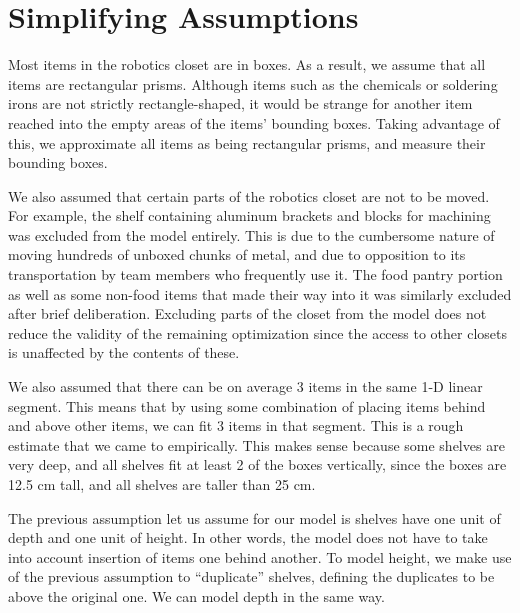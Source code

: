 \documentclass[10pt]{article}
\theoremstyle{named}
\begin{document}
\section{Simplifying Assumptions}
Most items in the robotics closet are in boxes. As a result, we assume that all
items are rectangular prisms. Although items such as the chemicals or soldering irons
are not strictly rectangle-shaped, it would be strange for another item reached into
the empty areas of the items' bounding boxes. Taking advantage of this, we approximate
all items as being rectangular prisms, and measure their bounding boxes.
\par
We also assumed that certain parts of the robotics closet are not to be moved. For
example, the shelf containing aluminum brackets and blocks for machining was excluded
from the model entirely. This is due to the cumbersome nature of moving hundreds of
unboxed chunks of metal, and due to opposition to its transportation by team members
who frequently use it. The food pantry portion as well as some non-food items that
made their way into it was similarly excluded after brief deliberation. Excluding
parts of the closet from the model does not reduce the validity of the remaining
optimization since the access to other closets is unaffected by the contents of these.
\par
We also assumed that there can be on average 3 items in the same 1-D linear
segment. This means that by using some combination of placing items behind
and above other items, we can fit 3 items in that segment. This is a rough
estimate that we came to empirically. This makes sense because some shelves are
very deep, and all shelves fit at least 2 of the boxes vertically, since
the boxes are 12.5 cm tall, and all shelves are taller than 25 cm. 
\par
The previous assumption let us assume for our model is shelves have one unit of depth
and one unit of height. In other words, the model does not have to take into account
insertion of items one behind another. To model height, we make use of the previous
assumption to ``duplicate'' shelves, defining the duplicates to be above the original
one. We can model depth in the same way. 
\end{document}
